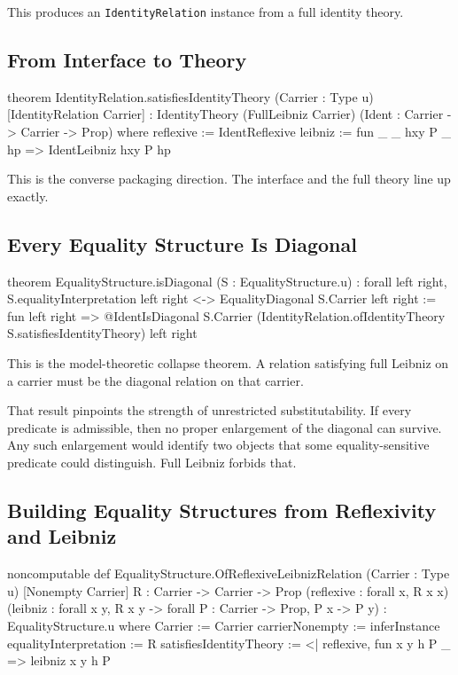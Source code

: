 \documentclass[11pt]{article}
\newcommand{\leaninline}[1]{\texttt{#1}}
\begin{document}
This produces an \leaninline{IdentityRelation} instance from a full identity theory.

\subsection{From Interface to Theory}

\begin{leanblock}
theorem IdentityRelation.satisfiesIdentityTheory (Carrier : Type u)
    [IdentityRelation Carrier] :
    IdentityTheory (FullLeibniz Carrier) (Ident : Carrier -> Carrier -> Prop) where
  reflexive := IdentReflexive
  leibniz := fun _ _ hxy P _ hp => IdentLeibniz hxy P hp
\end{leanblock}

This is the converse packaging direction. The interface and the full theory line up exactly.

\subsection{Every Equality Structure Is Diagonal}

\begin{leanblock}
theorem EqualityStructure.isDiagonal (S : EqualityStructure.{u}) :
    forall left right,
      S.equalityInterpretation left right <->
        EqualityDiagonal S.Carrier left right :=
  fun left right =>
    @IdentIsDiagonal S.Carrier
      (IdentityRelation.ofIdentityTheory S.satisfiesIdentityTheory) left right
\end{leanblock}

This is the model-theoretic collapse theorem. A relation satisfying full Leibniz on a carrier must be the diagonal relation on that carrier.

That result pinpoints the strength of unrestricted substitutability. If every predicate is admissible, then no proper enlargement of the diagonal can survive. Any such enlargement would identify two objects that some equality-sensitive predicate could distinguish. Full Leibniz forbids that.

\subsection{Building Equality Structures from Reflexivity and Leibniz}

\begin{leanblock}
noncomputable def EqualityStructure.OfReflexiveLeibnizRelation
    (Carrier : Type u) [Nonempty Carrier] {R : Carrier -> Carrier -> Prop}
    (reflexive : forall x, R x x)
    (leibniz : forall x y, R x y -> forall P : Carrier -> Prop, P x -> P y) :
    EqualityStructure.{u} where
  Carrier := Carrier
  carrierNonempty := inferInstance
  equalityInterpretation := R
  satisfiesIdentityTheory := <|
    reflexive,
    fun x y h P _ => leibniz x y h P
\end{leanblock}
\end{document}
